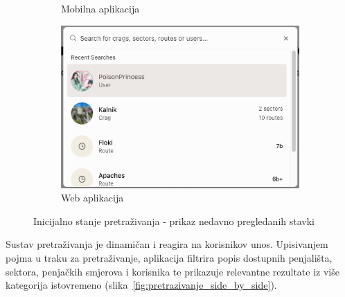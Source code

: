 \begin{figure}[H]
\begin{subfigure}[b]{0.35\textwidth}
        \caption{Mobilna aplikacija}
        \label{fig:pretrazivanje_default}
    \end{subfigure}
    \hfill
    \begin{subfigure}[b]{0.6\textwidth}
        \centering
        \includegraphics[width=\textwidth]{images/implementacija/web/search_default.png}
        \caption{Web aplikacija}
        \label{fig:pretrazivanje_searching}
    \end{subfigure}
    \caption{Inicijalno stanje pretraživanja - prikaz nedavno pregledanih stavki}
    \label{fig:pretrazivanje_sidebyside}
\end{figure}

Sustav pretraživanja je dinamičan i reagira na korisnikov unos. Upisivanjem pojma u traku za pretraživanje, aplikacija filtrira popis dostupnih penjališta, sektora, penjačkih smjerova i korisnika te prikazuje relevantne rezultate iz više kategorija istovremeno (slika~\ref{fig:pretrazivanje_side_by_side}). 

